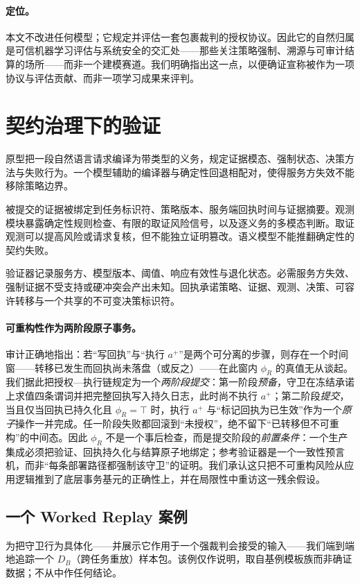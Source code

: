 \documentclass[11pt]{ctexart}
\begin{document}
\paragraph{定位。} 本文不改进任何模型；它规定并评估一套包裹裁判的授权协议。因此它的自然归属是可信机器学习评估与系统安全的交汇处——那些关注策略强制、溯源与可审计结算的场所——而非一个建模赛道。我们明确指出这一点，以便确证宣称被作为一项协议与评估贡献、而非一项学习成果来评判。

\section{契约治理下的验证}
原型把一段自然语言请求编译为带类型的义务，规定证据模态、强制状态、决策方法与失败行为。一个模型辅助的编译器与确定性回退相配对，使得服务方失效不能移除策略边界。

被提交的证据被绑定到任务标识符、策略版本、服务端回执时间与证据摘要。观测模块暴露确定性规则检查、有限的取证风险信号，以及逐义务的多模态判断。取证观测可以提高风险或请求复核，但不能独立证明篡改。语义模型不能推翻确定性的契约失败。

验证器记录服务方、模型版本、阈值、响应有效性与退化状态。必需服务方失效、强制证据不受支持或硬冲突会产出未知。回执承诺策略、证据、观测、决策、可容许转移与一个共享的不可变决策标识符。

\paragraph{可重构性作为两阶段原子事务。} 审计正确地指出：若“写回执”与“执行 $a^+$”是两个可分离的步骤，则存在一个时间窗——转移已发生而回执尚未落盘（或反之）——在此窗内 $\phi_R$ 的真值无从谈起。我们据此把授权—执行链规定为一个\emph{两阶段提交}：第一阶段\emph{预备}，守卫在冻结承诺上求值四条谓词并把完整回执写入持久日志，此时尚不执行 $a^+$；第二阶段\emph{提交}，当且仅当回执已持久化且 $\phi_R=\top$ 时，执行 $a^+$ 与“标记回执为已生效”作为一个\emph{原子}操作一并完成。任一阶段失败都回滚到“未授权”，绝不留下“已转移但不可重构”的中间态。因此 $\phi_R$ 不是一个事后检查，而是提交阶段的\emph{前置条件}：一个生产集成必须把验证、回执持久化与结算原子地绑定；参考验证器是一个一致性预言机，而非“每条部署路径都强制该守卫”的证明。我们承认这只把不可重构风险从应用逻辑推到了底层事务基元的正确性上，并在局限性中重访这一残余假设。

\subsection{一个 Worked Replay 案例}
\label{sec:worked}
为把守卫行为具体化——并展示它作用于一个强裁判会接受的输入——我们端到端地追踪一个 $D_B$（跨任务重放）样本包。该例仅作说明，取自基例模板族而非确证数据；不从中作任何结论。
\end{document}
